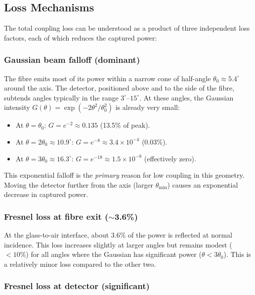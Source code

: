\subsection{Loss Mechanisms}

The total coupling loss can be understood as a product of three
independent loss factors, each of which reduces the captured power:

\subsubsection{Gaussian beam falloff (dominant)}

The fibre emits most of its power within a narrow cone of half-angle
$\theta_0 \approx 5.4^\circ$ around the axis.  The detector, positioned
above and to the side of the fibre, subtends angles typically in the
range $3^\circ$--$15^\circ$.  At these angles, the Gaussian intensity
$G(\theta) = \exp(-2\theta^2/\theta_0^2)$ is already very small:
%
\begin{itemize}
  \item At $\theta = \theta_0$: $G = e^{-2} \approx 0.135$ (13.5\%
        of peak).
  \item At $\theta = 2\theta_0 \approx 10.9^\circ$:
        $G = e^{-8} \approx 3.4 \times 10^{-4}$ (0.03\%).
  \item At $\theta = 3\theta_0 \approx 16.3^\circ$:
        $G = e^{-18} \approx 1.5 \times 10^{-8}$ (effectively zero).
\end{itemize}
%
This exponential falloff is the \emph{primary} reason for low coupling
in this geometry.  Moving the detector further from the axis (larger
$\theta_\text{min}$) causes an exponential decrease in captured power.

\subsubsection{Fresnel loss at fibre exit ($\sim$3.6\%)}

At the glass-to-air interface, about 3.6\% of the power is reflected
at normal incidence.  This loss increases slightly at larger angles but
remains modest ($< 10\%$) for all angles where the Gaussian has
significant power ($\theta < 3\theta_0$).  This is a relatively minor
loss compared to the other two.

\subsubsection{Fresnel loss at detector (significant)}

